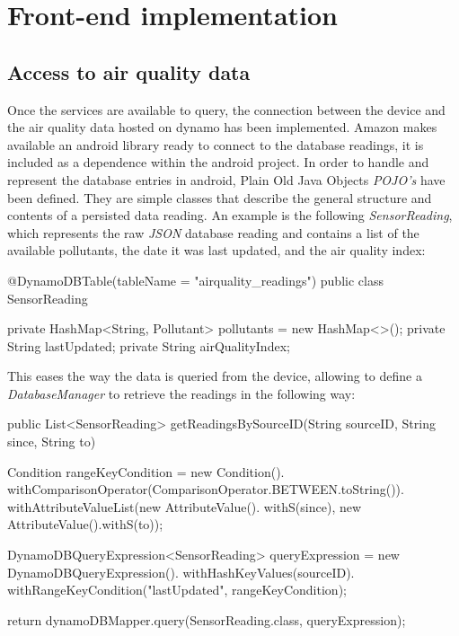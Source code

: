 \section{Front-end implementation}
\subsection{Access to air quality data}
Once the services are available to query, the connection between the device and the air quality data hosted on dynamo has been implemented. Amazon makes available an android library ready to connect to the database readings, it is included as a dependence within the android project. In order to handle and represent the database entries in android, Plain Old Java Objects \textit{POJO's} have been defined. They  are simple classes that describe the general structure and contents of a persisted data reading. An example is the following \textit{SensorReading}, which represents the raw \textit{JSON} database reading  and contains a list of the available pollutants, the date it was last updated, and the air quality index:

{\centering
\begin{spverbatim}

@DynamoDBTable(tableName = "airquality_readings")
public class SensorReading {

    private HashMap<String, Pollutant> pollutants = new HashMap<>();
    private String lastUpdated;
    private String airQualityIndex;
}
\end{spverbatim}
\par
}

This eases the way the data is queried from the device, allowing to define a \textit{DatabaseManager} to retrieve the readings in the following way: 

{\centering
\begin{spverbatim}
public List<SensorReading> getReadingsBySourceID(String sourceID, String since, String to) {

  Condition rangeKeyCondition = new Condition().
    withComparisonOperator(ComparisonOperator.BETWEEN.toString()).
    withAttributeValueList(new AttributeValue().
    withS(since), new AttributeValue().withS(to));

  DynamoDBQueryExpression<SensorReading> queryExpression = new
    DynamoDBQueryExpression().
    withHashKeyValues(sourceID).
    withRangeKeyCondition("lastUpdated", rangeKeyCondition);
  
return dynamoDBMapper.query(SensorReading.class, queryExpression);
}
\end{spverbatim}
\par
}

